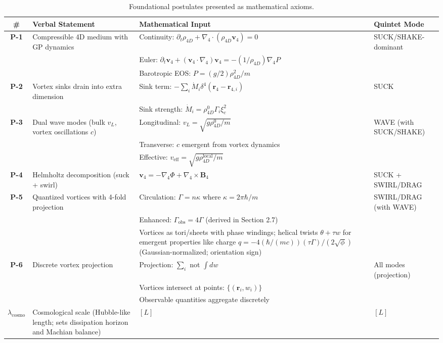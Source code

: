 \begin{table}[H]
\centering
\begin{tabularx}{\textwidth}{|c|Y|Y|Y|}
\hline
\# & Verbal Statement & Mathematical Input & Quintet Mode \\
\hline
\textbf{P-1} & Compressible 4D medium with GP dynamics & Continuity: $\partial_t \rho_{4D} + \nabla_4 \cdot (\rho_{4D} \mathbf{v}_4) = 0$ & SUCK/SHAKE-dominant \\
& & Euler: $\partial_t \mathbf{v}_4 + (\mathbf{v}_4 \cdot \nabla_4) \mathbf{v}_4 = -(1/\rho_{4D}) \nabla_4 P$ &  \\
& & Barotropic EOS: $P = (g/2) \rho_{4D}^2 / m$ &  \\
\hline
\textbf{P-2} & Vortex sinks drain into extra dimension & Sink term: $-\sum_i \dot{M}_i \delta^4(\mathbf{r}_4 - \mathbf{r}_{4,i})$ & SUCK \\
& & Sink strength: $\dot{M}_i = \rho_{4D}^0 \Gamma_i \xi_c^2$ &  \\
\hline
\textbf{P-3} & Dual wave modes (bulk $v_L$, vortex oscillations $c$) & Longitudinal: $v_L = \sqrt{g \rho_{4D}^0 / m}$ & WAVE (with SUCK/SHAKE) \\
& & Transverse: $c$ emergent from vortex dynamics &  \\
& & Effective: $v_{\text{eff}} = \sqrt{g \rho_{4D}^{\text{local}} / m}$ &  \\
\hline
\textbf{P-4} & Helmholtz decomposition (suck + swirl) & $\mathbf{v}_4 = -\nabla_4 \Phi + \nabla_4 \times \mathbf{B}_4$ & SUCK + SWIRL/DRAG \\
\hline
\textbf{P-5} & Quantized vortices with 4-fold projection & Circulation: $\Gamma = n \kappa$ where $\kappa = 2 \pi \hbar / m$ & SWIRL/DRAG (with WAVE) \\
& & Enhanced: $\Gamma_{\text{obs}} = 4 \Gamma$ (derived in Section 2.7) &  \\
& & Vortices as tori/sheets with phase windings; helical twists $\theta + \tau w$ for emergent properties like charge $q = -4 (\hbar / (m c)) (\tau \Gamma) / (2 \sqrt{\phi})$ (Gaussian-normalized; orientation sign) &  \\
\hline
\textbf{P-6} & Discrete vortex projection & Projection: $\sum_i$ not $\int dw$ & All modes (projection) \\
& & Vortices intersect at points: $\{(\mathbf{r}_i, w_i)\}$ &  \\
& & Observable quantities aggregate discretely &  \\
\hline

$\lambda_{\text{cosmo}}$ & Cosmological scale (Hubble-like length; sets dissipation horizon and Machian balance) & $[L]$ & $[L]$ \\
\hline
\end{tabularx}
\caption{Foundational postulates presented as mathematical axioms.}
\label{tab:postulates}
\end{table}

